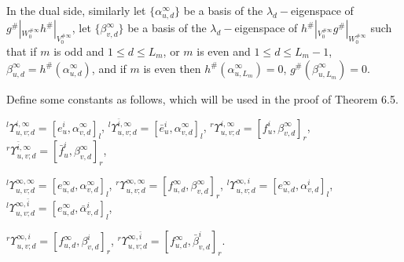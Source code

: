 \def\CTEXPreproc{Created by ctex v0.2.12, don't edit!}\documentclass[11pt]{article}
\begin{document}
In the dual side, similarly let $\{ \alpha^{\infty}_{u,d}\}$ be a basis of the $\lambda_d -$eigenspace of
$g^{\#}|_{W^{\# \infty}_0 } h^{\#}|_{V^{\# \infty}_0 }  $, let  $\{ \beta^{\infty}_{v,d}\}$ be a basis of the $\lambda_d -$eigenspace of
$ h^{\#}|_{V^{\# \infty}_0 } g^{\#}|_{W^{\# \infty}_0 } $ such that if $m$ is odd and $1\leq d\leq L_m$, or $m$ is even and $1\leq d\leq L_m -1$, $\beta^{\infty}_{u,d}= h^{\#}( \alpha^{\infty}_{u,d} )$, and if $m$ is even then $h^{\#}(\alpha^{\infty}_{u,L_m })=0 $,
$g^{\#}(\beta^{\infty}_{u,L_m })=0 $.






Define some constants as follows, which will be used in the proof of Theorem 6.5.

   ${}^l \Upsilon^{i,\infty}_{u,v;d}=[ e^i _u , \alpha^{\infty}_{v,d}  ]_l $,
  ${}^l \Upsilon^{\bar{i},\infty}_{u,v;d}=[ \bar{e}^i _u , \alpha^{\infty}_{v,d}  ]_l $,
   ${}^r \Upsilon^{i,\infty}_{u,v;d}=[ f^i _u , \beta^{\infty}_{v,d}  ]_r $,
   ${}^r \Upsilon^{\bar{i},\infty}_{u,v;d}=[ \bar{f}^i _u , \beta^{\infty}_{v,d}  ]_r $,

   ${}^l \Upsilon^{\infty,\infty}_{u,v;d}=[ e^{\infty}_{u,d} , \alpha^{\infty}_{v,d}  ]_l   $,
    ${}^r \Upsilon^{\infty,\infty}_{u,v;d}=[ f^{\infty}_{u,d} , \beta^{\infty}_{v,d}  ]_r  $,
     ${}^l \Upsilon^{\infty,i}_{u,v;d}=[ e^{\infty}_{u,d} , \alpha^{i}_{v,d}  ]_l   $,
     ${}^l \Upsilon^{\infty,\bar{i}}_{u,v;d}=[ e^{\infty}_{u,d} , \bar{\alpha}^{i}_{v,d}  ]_l   $,

      ${}^r \Upsilon^{\infty,i}_{u,v;d}=[ f^{\infty}_{u,d} , \beta^{i}_{v,d}  ]_r  $,
       ${}^r \Upsilon^{\infty,\bar{i}}_{u,v;d}=[ f^{\infty}_{u,d} , \bar{\beta}^{i}_{v,d}  ]_r  $.
\end{document}
